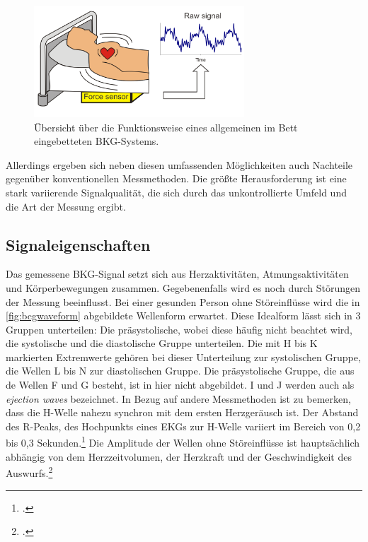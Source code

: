 	 \begin{figure}[H]
	 	\centering
		\includegraphics[width=0.7\textwidth]{pic/bcgBed.png}
		\caption[Übersicht übeer die Funktionsweise eines allgemeinen im Bett eingebetteten \ac{BKG}-Systems]{Übersicht über die Funktionsweise eines allgemeinen im Bett eingebetteten \ac{BKG}-Systems.\protect\footnotemark}
		\label{fig:bcgbed}
	\end{figure}
	
	Allerdings ergeben sich neben diesen umfassenden Möglichkeiten auch Nachteile gegenüber konventionellen Messmethoden. Die größte Herausforderung ist eine stark variierende Signalqualität, die sich durch das unkontrollierte Umfeld und die Art der Messung ergibt.

	\subsection{Signaleigenschaften}
	
	Das gemessene \ac{BKG}-Signal setzt sich aus Herzaktivitäten, Atmungsaktivitäten und Körperbewegungen zusammen. Gegebenenfalls wird es noch durch Störungen der Messung beeinflusst. Bei einer gesunden Person ohne Störeinflüsse wird die in \ref{fig:bcgwaveform} abgebildete Wellenform erwartet. Diese Idealform lässt sich in 3 Gruppen unterteilen: Die präsystolische, wobei diese häufig nicht beachtet wird, die systolische und die diastolische Gruppe unterteilen. Die mit H bis K markierten Extremwerte gehören bei dieser Unterteilung zur systolischen Gruppe, die Wellen L bis N zur diastolischen Gruppe. Die präsystolische Gruppe, die aus de Wellen F und G besteht, ist in hier nicht abgebildet. I und J werden auch als \textit{ejection waves} bezeichnet. In Bezug auf andere Messmethoden ist zu bemerken, dass die H-Welle nahezu synchron mit dem ersten Herzgeräusch ist. Der Abstand des R-Peaks, des Hochpunkts eines \ac{EKG}s zur H-Welle variiert im Bereich von 0,2 bis 0,3 Sekunden.\footcite[Vgl.][]{DELALLA1950} Die Amplitude der Wellen ohne Störeinflüsse ist hauptsächlich abhängig von dem Herzzeitvolumen, der Herzkraft und der Geschwindigkeit des Auswurfs.\footcite[Vgl.][]{Pinheiro2010}
	
